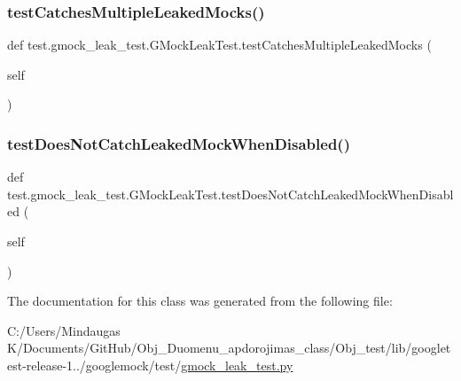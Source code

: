 \mbox{\label{classtest_1_1gmock__leak__test_1_1_g_mock_leak_test_a41a547f4101a83e3df6818466d9b2839}} 
\subsubsection{\texorpdfstring{testCatchesMultipleLeakedMocks()}{testCatchesMultipleLeakedMocks()}}
{\footnotesize\ttfamily def test.\+gmock\+\_\+leak\+\_\+test.\+G\+Mock\+Leak\+Test.\+test\+Catches\+Multiple\+Leaked\+Mocks (\begin{DoxyParamCaption}\item[{}]{self }\end{DoxyParamCaption})}

\mbox{\label{classtest_1_1gmock__leak__test_1_1_g_mock_leak_test_acd94a559f04bfe2bdf85217e19a8f0aa}} 
\subsubsection{\texorpdfstring{testDoesNotCatchLeakedMockWhenDisabled()}{testDoesNotCatchLeakedMockWhenDisabled()}}
{\footnotesize\ttfamily def test.\+gmock\+\_\+leak\+\_\+test.\+G\+Mock\+Leak\+Test.\+test\+Does\+Not\+Catch\+Leaked\+Mock\+When\+Disabled (\begin{DoxyParamCaption}\item[{}]{self }\end{DoxyParamCaption})}



The documentation for this class was generated from the following file\+:\begin{DoxyCompactItemize}
\item 
C\+:/\+Users/\+Mindaugas K/\+Documents/\+Git\+Hub/\+Obj\+\_\+\+Duomenu\+\_\+apdorojimas\+\_\+class/\+Obj\+\_\+test/lib/googletest-\/release-\/1../googlemock/test/\mbox{\hyperlink{_obj__test_2lib_2googletest-release-1_88_81_2googlemock_2test_2gmock__leak__test_8py}{gmock\+\_\+leak\+\_\+test.\+py}}\end{DoxyCompactItemize}
